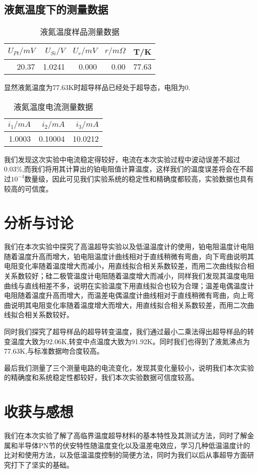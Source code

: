 \documentclass[UTF8]{ctexart}
\begin{document}
	\subsection{液氮温度下的测量数据}
	\begin{table}[H]
		\caption{液氮温度样品测量数据}
		\label{液氮温度样品测量数据}
		\centering
		\begin{tabular}{|r|r|r|r|r|}
			\hline
			$U_{Pt}/mV$&$U_{Si}/V$&$U_{r}/mV$&$r/m\Omega$&T/K\\
			\midrule
			20.37&1.0241&0.000&0.00&77.63\\
			\hline
		\end{tabular}
	\end{table}
\par 显然液氮温度为77.63K时超导样品已经处于超导态，电阻为0.
	\begin{table}[H]
	\caption{液氮温度电流测量数据}
	\label{液氮温度电流测量数据}
	\centering
	\begin{tabular}{|r|r|r|}
		\hline
		$i_{1}/mA$&$i_{2}/mA$&$i_{3}/mA$\\
		\midrule
		1.0003&0.10004&10.0212\\
		\hline
	\end{tabular}
\end{table}
\par 我们发现这次实验中电流稳定得较好，电流在本次实验过程中波动误差不超过0.03\%,而我们将用其计算出的铂电阻值计算温度，这样我们的温度误差将会在不超过$10^{-4}$数量级，因此可见我们实验系统的稳定性和精确度都较高，实验数据也具有较高的可信度。
	\section{分析与讨论}
	我们在本次实验中探究了高温超导实验以及低温温度计的使用，铂电阻温度计电阻随着温度升高而增大，铂电阻温度计曲线相对于直线稍微有弯曲，向下弯曲说明其电阻变化率随着温度增大而减小，用直线拟合相关系数较差，而用二次曲线拟合相关系数较好；硅二极管温度计电阻随着温度增大而减小，同样我们发现其温度电阻曲线与直线相差不多，说明在实验温度下用直线拟合也较为合理；温差电偶温度计电阻随着温度升高而增大，而温差电偶温度计曲线相对于直线稍微有弯曲，向上弯曲说明其电阻变化率随着温度增大而增大，用直线拟合相关系数较差，而用二次曲线拟合相关系数较好。
	
	同时我们探究了超导样品的超导转变温度，我们通过最小二乘法得出超导样品的转变温度大致为92.06K,转变中点温度大致为91.92K。同时我们也得到了液氮沸点为77.63K,与标准数据吻合度较高。
	
	最后我们测量了三个测量电路的电流变化，发现其变化量较小，说明我们本次实验的精确度和系统稳定性都较好，我们本次实验数据可信度较高。
	\section{收获与感想}
	我们在本次实验了解了高临界温度超导材料的基本特性及其测试方法，同时了解金属和半导体PN节的伏安特性随温度变化以及温差电效应，学习几种低温温度计的比对和使用方法，以及低温温度控制的简便方法，同时为我们以后从事超导方面研究打下了坚实的基础。
\end{document}
